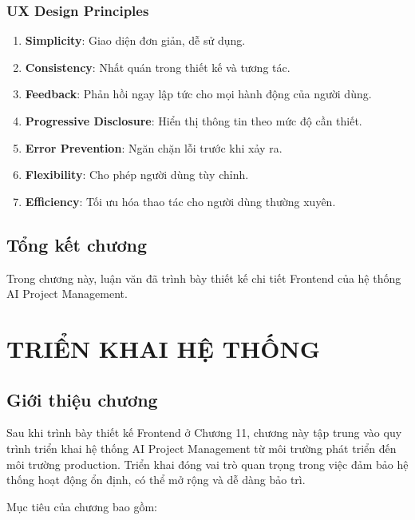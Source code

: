 \documentclass[12pt,a4paper]{report}
\begin{document}
\subsection{UX Design Principles}

\begin{enumerate}
\item \textbf{Simplicity}: Giao diện đơn giản, dễ sử dụng.
\item \textbf{Consistency}: Nhất quán trong thiết kế và tương tác.
\item \textbf{Feedback}: Phản hồi ngay lập tức cho mọi hành động của người dùng.
\item \textbf{Progressive Disclosure}: Hiển thị thông tin theo mức độ cần thiết.
\item \textbf{Error Prevention}: Ngăn chặn lỗi trước khi xảy ra.
\item \textbf{Flexibility}: Cho phép người dùng tùy chỉnh.
\item \textbf{Efficiency}: Tối ưu hóa thao tác cho người dùng thường xuyên.
\end{enumerate}

\section{Tổng kết chương}


Trong chương này, luận văn đã trình bày thiết kế chi tiết Frontend của hệ thống AI Project Management.

\chapter{TRIỂN KHAI HỆ THỐNG}
\label{chap:deployment}

\section{Giới thiệu chương}

Sau khi trình bày thiết kế Frontend ở Chương 11, chương này tập trung vào quy trình triển khai hệ thống AI Project Management từ môi trường phát triển đến môi trường production. Triển khai đóng vai trò quan trọng trong việc đảm bảo hệ thống hoạt động ổn định, có thể mở rộng và dễ dàng bảo trì.

Mục tiêu của chương bao gồm:
\end{document}

